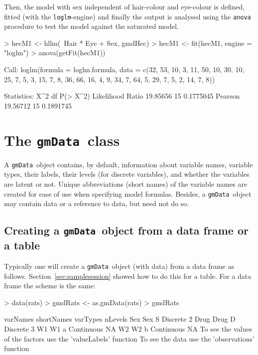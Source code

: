 \documentclass{article}
\def\code#1{\texttt{#1}}
\def\gmData            {\code{gmData}}
\def\gmData             {\code{gmData}}
\begin{document}
Then, the model with sex independent of hair-colour and eye-colour is
defined, fitted (with the \code{loglm}-engine) and finally the output
is analysed using the \code{anova} procedure to test the model against
the saturated model.

\footnotesize
\begin{Schunk}
\begin{Sinput}
> hecM1 <- hllm(~Hair * Eye + Sex, gmdHec)
> hecM1 <- fit(hecM1, engine = "loglm")
> anova(getFit(hecM1))
\end{Sinput}
\begin{Soutput}
Call:
loglm(formula = loglm.formula, data = c(32, 53, 10, 3, 11, 50, 
10, 30, 10, 25, 7, 5, 3, 15, 7, 8, 36, 66, 16, 4, 9, 34, 7, 64, 
5, 29, 7, 5, 2, 14, 7, 8))

Statistics:
                      X^2 df  P(> X^2)
Likelihood Ratio 19.85656 15 0.1775045
Pearson          19.56712 15 0.1891745
\end{Soutput}
\end{Schunk}
\normalsize

\section[The gmData class]{The \protect\gmData\ class}
\label{sec:gmData}

A \gmData\ object contains, by default, information about variable
names, variable types, their labels, their levels (for discrete
variables), and whether the variables are latent or not. Unique
abbreviations (short names) of the variable names are created for ease
of use when specifying model formulas. Besides, a \gmData\ object may
contain data or a reference to data, but need not do so.

\subsection[Creating a gmData object from a data frame or a table]%
{Creating a \protect\gmData\ object from a data frame or a table}


Typically one will create a \gmData\ object (with data) from a data
frame as follows. Section~\ref{sec:samplesession} showed how to do
this for a table. For a data frame the scheme is the same:

\footnotesize
\begin{Schunk}
\begin{Sinput}
> data(rats)
> gmdRats <- as.gmData(rats)
> gmdRats
\end{Sinput}
\begin{Soutput}
     varNames shortNames   varTypes nLevels
Sex       Sex          S   Discrete       2
Drug     Drug          D   Discrete       3
W1         W1          a Continuous      NA
W2         W2          b Continuous      NA
To see the values of the factors use the 'valueLabels' function
To see the data use the 'observations' function
\end{Soutput}
\end{Schunk}
\normalsize
\end{document}
